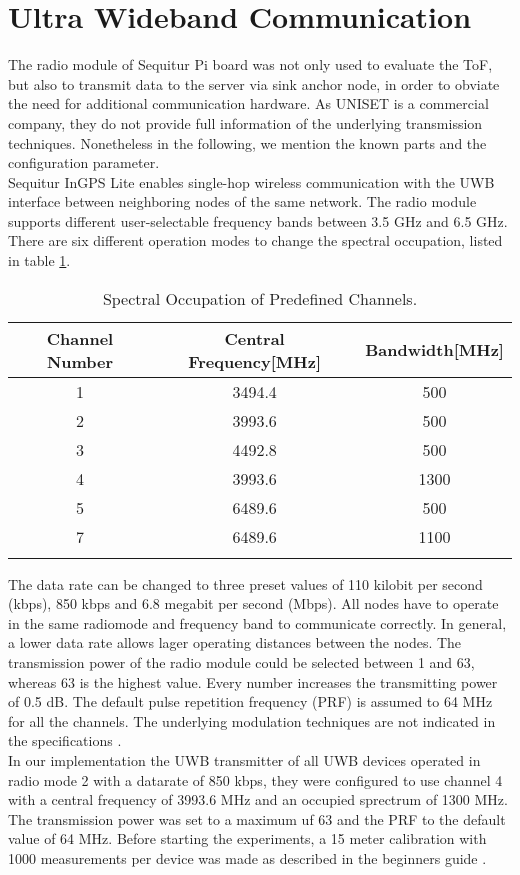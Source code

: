 \section{Ultra Wideband Communication}
The radio module of Sequitur Pi board was not only used  to evaluate the ToF, but also to transmit data to the server via sink anchor node, in order to obviate the need for additional communication hardware. As UNISET is a commercial company, they do not provide full information of the underlying transmission techniques. Nonetheless in the following, we mention the known parts and the configuration parameter.\\
\noindent\hspace*{5mm}%
Sequitur InGPS Lite enables single-hop wireless communication with the UWB interface between neighboring nodes of the same network. The radio module supports different user-selectable frequency bands between 3.5 GHz and 6.5 GHz. There are six different operation modes to change the spectral occupation, listed in table \ref{tab:spectral_occupation}.\\
\begin{table}
\caption{Spectral Occupation of Predefined Channels.}
\label{tab:spectral_occupation}
\centering
\begin{tabular}{c c c}
\toprule
\textbf{Channel Number} & \textbf{Central Frequency}[MHz] & \textbf{Bandwidth}[MHz]\\
\midrule
1 & 3494.4 & 500\\
2 & 3993.6 & 500\\
3 & 4492.8 & 500\\
4 & 3993.6 & 1300\\
5 & 6489.6 & 500\\
7 & 6489.6 & 1100\\
\bottomrule\\
\end{tabular}
\end{table}
The data rate can be changed to three preset values of 110 kilobit per second (kbps), 850 kbps and 6.8 megabit per second (Mbps). All nodes have to operate in the same radiomode and frequency band to communicate correctly. In general, a lower data rate allows lager operating distances between the nodes. The transmission power of the radio module could be selected between 1 and 63, whereas 63 is the highest value. Every number increases the transmitting power of 0.5 dB. The default pulse repetition frequency (PRF) is assumed to 64 MHz for all the channels. The underlying modulation techniques are not indicated in the specifications \cite{Usermanual, Beginnersguide}.\\
\noindent\hspace*{5mm}%
In our implementation the UWB transmitter of all UWB devices operated in radio mode 2 with a datarate of 850 kbps, they were configured to use channel 4 with a central frequency of 3993.6 MHz and an occupied sprectrum of 1300 MHz. The transmission power was set to a maximum uf 63 and the PRF to the default value of 64 MHz. Before starting the experiments, a 15 meter calibration with 1000 measurements per device was made as described in the beginners guide \cite{Beginnersguide}.